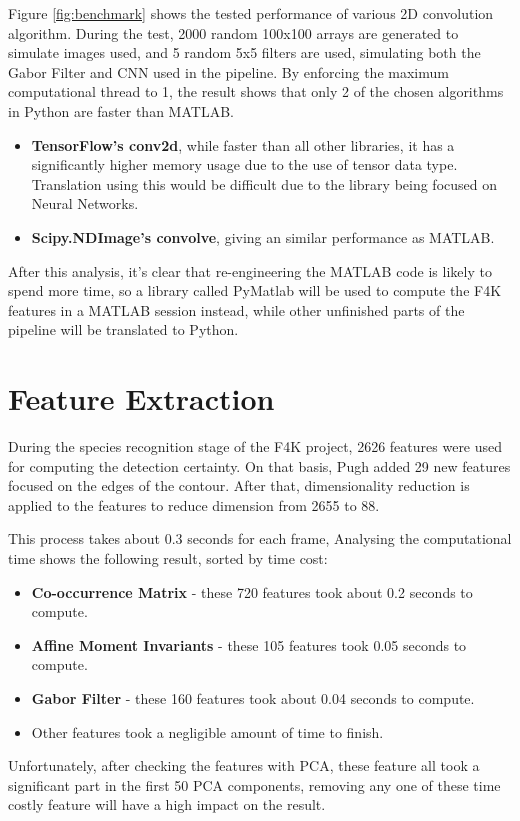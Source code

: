 \documentclass[bsc,logo,twoside,fullspacing,parskip]{infthesis}
\begin{document}
Figure \ref{fig:benchmark} shows the tested performance of various 2D convolution algorithm. During the test, 2000 random 100x100 arrays are generated to simulate images used, and 5 random 5x5 filters are used, simulating both the Gabor Filter and CNN used in the pipeline. By enforcing the maximum computational thread to 1, the result shows that only 2 of the chosen algorithms in Python are faster than MATLAB.
\begin{itemize}
\setlength{\parskip}{1pt}
\item
\textbf{TensorFlow's conv2d}, while faster than all other libraries, it has a significantly higher memory usage due to the use of tensor data type. Translation using this would be difficult due to the library being focused on Neural Networks.
\item
\textbf{Scipy.NDImage's convolve}, giving an similar performance as MATLAB.
\end{itemize}

After this analysis, it's clear that re-engineering the MATLAB code is likely to spend more time, so a library called PyMatlab will be used to compute the F4K features in a MATLAB session instead, while other unfinished parts of the pipeline will be translated to Python.

\section{Feature Extraction}

During the species recognition stage of the F4K project, 2626 features were used for computing the detection certainty.
On that basis, Pugh added 29 new features focused on the edges of the contour. 
After that, dimensionality reduction is applied to the features to reduce dimension from 2655 to 88.

This process takes about 0.3 seconds for each frame, Analysing the computational time shows the following result, sorted by time cost:
\begin{itemize}
\setlength{\parskip}{1pt}
\item
\textbf{Co-occurrence Matrix} - these 720 features took about 0.2 seconds to compute.
\item
\textbf{Affine Moment Invariants} - these 105 features took 0.05 seconds to compute.
\item
\textbf{Gabor Filter} - these 160 features took about 0.04 seconds to compute.
\item Other features took a negligible amount of time to finish.
\end{itemize}
Unfortunately, after checking the features with PCA, these feature all took a significant part in the first 50 PCA components, removing any one of these time costly feature will have a high impact on the result.
\end{document}

